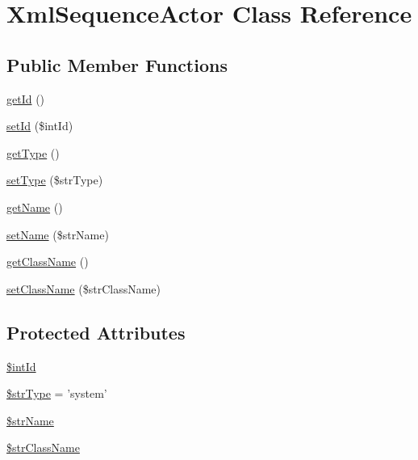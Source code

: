 \hypertarget{class_xml_sequence_actor}{
\section{XmlSequenceActor Class Reference}
\label{class_xml_sequence_actor}
}
\subsection*{Public Member Functions}
\begin{CompactItemize}
\item 
\hyperlink{class_xml_sequence_actor_12251d0c022e9e21c137a105ff683f13}{getId} ()
\item 
\hyperlink{class_xml_sequence_actor_7a72a09ca694e9785f917216f4d9180a}{setId} (\$intId)
\item 
\hyperlink{class_xml_sequence_actor_830b5c75df72b32396701bc563fbe3c7}{getType} ()
\item 
\hyperlink{class_xml_sequence_actor_48d409343c54e747174ffaf5911b2cd9}{setType} (\$strType)
\item 
\hyperlink{class_xml_sequence_actor_3d0963e68bb313b163a73f2803c64600}{getName} ()
\item 
\hyperlink{class_xml_sequence_actor_c05d9184d52b7a34210a801767bef213}{setName} (\$strName)
\item 
\hyperlink{class_xml_sequence_actor_b8f8ee56588ebf5091c288e44ebdfaf4}{getClassName} ()
\item 
\hyperlink{class_xml_sequence_actor_35ca4f6ef761ae92cfbd3c42f73793e7}{setClassName} (\$strClassName)
\end{CompactItemize}
\subsection*{Protected Attributes}
\begin{CompactItemize}
\item 
\hyperlink{class_xml_sequence_actor_a53d60bfd4dfc5b04cd34ac011b617aa}{\$intId}
\item 
\hyperlink{class_xml_sequence_actor_ac9a08cb422ab9a398d451299b054e28}{\$strType} = 'system'
\item 
\hyperlink{class_xml_sequence_actor_90edf7538a74be8ac5ce46baaf203382}{\$strName}
\item 
\hyperlink{class_xml_sequence_actor_35e72db77496f4544796187dbac02904}{\$strClassName}
\end{CompactItemize}


